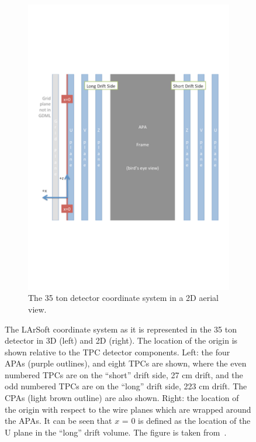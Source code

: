 \begin{figure}
\begin{subfigure}{0.48\textwidth}
    \includegraphics[width=\textwidth]{35ton_xCenter}
    \caption{The 35 ton detector coordinate system in a 2D aerial view.}
  \end{subfigure}
  \caption[The LArSoft coordinate system as it is represented in the 35 ton detector]
          {The LArSoft coordinate system as it is represented in the 35 ton detector in 3D (left) and 2D (right). The location of the origin is shown relative to the TPC detector components. Left: the four APAs (purple outlines), and eight TPCs are shown, where the even numbered TPCs are on the ``short'' drift side, 27 cm drift, and the odd numbered TPCs are on the ``long'' drift side, 223 cm drift. The CPAs (light brown outline) are also shown. Right: the location of the origin with respect to the wire planes which are wrapped around the APAs. It can be seen that $x$ = 0 is defined as the location of the U plane in the ``long'' drift volume. The figure is taken from~\citep{35tonGeomPage}.}
  \label{fig:LArSoft_coords}
\end{figure}

